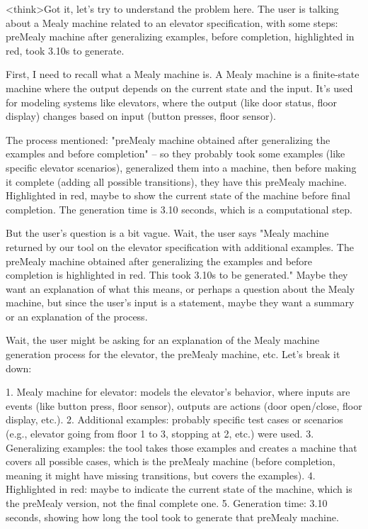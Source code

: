 <think>Got it, let's try to understand the problem here. The user is talking about a Mealy machine related to an elevator specification, with some steps: preMealy machine after generalizing examples, before completion, highlighted in red, took 3.10s to generate. 

First, I need to recall what a Mealy machine is. A Mealy machine is a finite-state machine where the output depends on the current state and the input. It's used for modeling systems like elevators, where the output (like door status, floor display) changes based on input (button presses, floor sensor). 

The process mentioned: "preMealy machine obtained after generalizing the examples and before completion" – so they probably took some examples (like specific elevator scenarios), generalized them into a machine, then before making it complete (adding all possible transitions), they have this preMealy machine. Highlighted in red, maybe to show the current state of the machine before final completion. The generation time is 3.10 seconds, which is a computational step.

But the user's question is a bit vague. Wait, the user says "Mealy machine returned by our tool on the elevator specification with additional examples. The preMealy machine obtained after generalizing the examples and before completion is highlighted in red. This took 3.10s to be generated." Maybe they want an explanation of what this means, or perhaps a question about the Mealy machine, but since the user's input is a statement, maybe they want a summary or an explanation of the process.

Wait, the user might be asking for an explanation of the Mealy machine generation process for the elevator, the preMealy machine, etc. Let's break it down:

1. Mealy machine for elevator: models the elevator's behavior, where inputs are events (like button press, floor sensor), outputs are actions (door open/close, floor display, etc.). 
2. Additional examples: probably specific test cases or scenarios (e.g., elevator going from floor 1 to 3, stopping at 2, etc.) were used. 
3. Generalizing examples: the tool takes those examples and creates a machine that covers all possible cases, which is the preMealy machine (before completion, meaning it might have missing transitions, but covers the examples). 
4. Highlighted in red: maybe to indicate the current state of the machine, which is the preMealy version, not the final complete one. 
5. Generation time: 3.10 seconds, showing how long the tool took to generate that preMealy machine.

